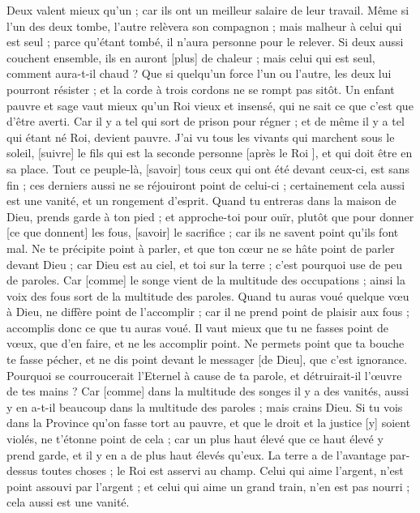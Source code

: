 \begin{multicols}{2}
Deux valent mieux qu'un ; car ils ont un meilleur salaire de leur travail.
Même si l'un des deux tombe, l'autre relèvera son compagnon ; mais malheur à celui qui est seul ; parce qu'étant tombé, il n'aura personne pour le relever.
Si deux aussi couchent ensemble, ils en auront [plus] de chaleur ; mais celui qui est seul, comment aura-t-il chaud ?
Que si quelqu'un force l'un ou l'autre, les deux lui pourront résister ; et la corde à trois cordons ne se rompt pas sitôt.
Un enfant pauvre et sage vaut mieux qu'un Roi vieux et insensé, qui ne sait ce que c'est que d'être averti.
Car il y a tel qui sort de prison pour régner ; et de même il y a tel qui étant né Roi, devient pauvre.
J'ai vu tous les vivants qui marchent sous le soleil, [suivre] le fils qui est la seconde personne [après le Roi ], et qui doit être en sa place.
Tout ce peuple-là, [savoir] tous ceux qui ont été devant ceux-ci, est sans fin ; ces derniers aussi ne se réjouiront point de celui-ci ; certainement cela aussi est une vanité, et un rongement d'esprit.
\VerseOne{}Quand tu entreras dans la maison de Dieu, prends garde à ton pied ; et approche-toi pour ouïr, plutôt que pour donner [ce que donnent] les fous, [savoir] le sacrifice ; car ils ne savent point qu'ils font mal.
Ne te précipite point à parler, et que ton cœur ne se hâte point de parler devant Dieu ; car Dieu est au ciel, et toi sur la terre ; c'est pourquoi use de peu de paroles.
Car [comme] le songe vient de la multitude des occupations ; ainsi la voix des fous sort de la multitude des paroles.
Quand tu auras voué quelque vœu à Dieu, ne diffère point de l'accomplir ; car il ne prend point de plaisir aux fous ; accomplis donc ce que tu auras voué.
Il vaut mieux que tu ne fasses point de vœux, que d'en faire, et ne les accomplir point.
Ne permets point que ta bouche te fasse pécher, et ne dis point devant le messager [de Dieu], que c'est ignorance. Pourquoi se courroucerait l'Eternel à cause de ta parole, et détruirait-il l'œuvre de tes mains ?
Car [comme] dans la multitude des songes il y a des vanités, aussi y en a-t-il beaucoup dans la multitude des paroles ; mais crains Dieu.
Si tu vois dans la Province qu'on fasse tort au pauvre, et que le droit et la justice [y] soient violés, ne t'étonne point de cela ; car un plus haut élevé que ce haut élevé y prend garde, et il y en a de plus haut élevés qu'eux.
La terre a de l'avantage par-dessus toutes choses ; le Roi est asservi au champ.
Celui qui aime l'argent, n'est point assouvi par l'argent ; et celui qui aime un grand train, n'en est pas nourri ; cela aussi est une vanité.

\end{multicols}
